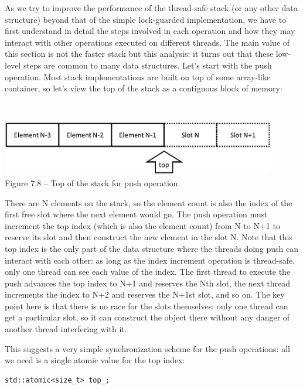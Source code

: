 As we try to improve the performance of the thread-safe stack (or any other data structure) beyond that of the simple lock-guarded implementation, we have to first understand in detail the steps involved in each operation and how they may interact with other operations executed on different threads. The main value of this section is not the faster stack but this analysis: it turns out that these low-level steps are common to many data structures. Let's start with the push operation. Most stack implementations are built on top of some array-like container, so let's view the top of the stack as a contiguous block of memory:

\hspace*{\fill} \\ %
\begin{center}
\includegraphics[width=0.9\textwidth]{content/2/chapter7/images/8.jpg}\\
Figure 7.8 – Top of the stack for push operation
\end{center}

There are N elements on the stack, so the element count is also the index of the first free slot where the next element would go. The push operation must increment the top index (which is also the element count) from N to N+1 to reserve its slot and then construct the new element in the slot N. Note that this top index is the only part of the data structure where the threads doing push can interact with each other: as long as the index increment operation is thread-safe, only one thread can see each value of the index. The first thread to execute the push advances the top index to N+1 and reserves the Nth slot, the next thread increments the index to N+2 and reserves the N+1st slot, and so on. The key point here is that there is no race for the slots themselves: only one thread can get a particular slot, so it can construct the object there without any danger of another thread interfering with it.

This suggests a very simple synchronization scheme for the push operations: all we need is a single atomic value for the top index:

\begin{lstlisting}[style=styleCXX]
std::atomic<size_t> top_;
\end{lstlisting}

